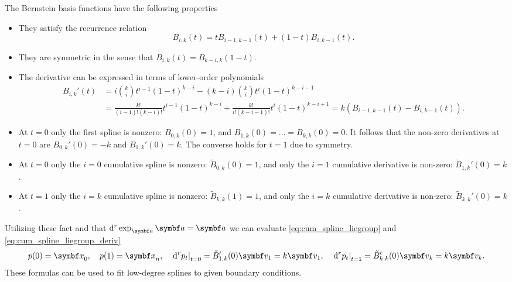 The Bernstein basis functions have the following properties
\begin{itemize}
  \item They satisfy the recurrence relation
        \begin{equation}
          \label{eq:bezier_recurrence}
          B_{i, k}(t) = t B_{i-1, k-1}(t) + (1-t) B_{i, k-1}(t).
        \end{equation}
  \item They are symmetric in the sense that $B_{i, k}(t) = B_{k-i, k}(1 - t)$.
  \item The derivative can be expressed in terms of lower-order polynomials
        \begin{equation*}
          \begin{aligned}
            B_{i, k}'(t)
             & = i \binom{k}{i} t^{i-1} (1-t)^{k-i} - (k-i) \binom{k}{i} t^{i} (1-t)^{k-i-1}                                                                         \\
             & = \frac{k!}{(i-1)! (k-i)!} t^{i-1} (1-t)^{k-i} + \frac{k!}{i! (k-i-1)!} t^{i} (1 - t)^{k - i + 1} = k \left(  B_{i-1, k-1}(t) - B_{i, k-1}(t)\right).
          \end{aligned}
        \end{equation*}
  \item At $t = 0$ only the first spline is nonzero: $B_{0, k}(0) = 1$, and $B_{1, k}(0) = \ldots = B_{k, k}(0) = 0$. It follows that the non-zero derivatives at $t = 0$ are $B_{0, k}'(0) = -k$ and $B_{1, k}'(0) = k$. The converse holds for $t = 1$ due to symmetry.
  \item At $t = 0$ only the $i=0$ cumulative spline is nonzero: $\tilde B_{0, k}(0) = 1$, and only the $i=1$ cumulative derivative is non-zero: $\tilde B_{1, k}'(0) = k$.
  \item At $t = 1$ only the $i=k$ cumulative spline is nonzero: $\tilde B_{k, k}(1) = 1$, and only the $i=k$ cumulative derivative is non-zero: $\tilde B_{k, k}'(0) = k$.
\end{itemize}

Utilizing these fact and that $\mathrm{d}^{r} \exp_{\a} \a = \a$ we can evaluate \eqref{eq:cum_spline_liegroup} and \eqref{eq:cum_spline_liegroup_deriv}
\begin{equation}
  p(0) = \x_{0}, \quad p(1) = \x_{n}, \quad \left. \mathrm{d}^{r} p_{t} \right|_{t=0} = \tilde B_{1, k}'(0) \symbf v_{1} = k \symbf v_{1}, \quad
  \left. \mathrm{d}^{r} p_{t} \right|_{t=1} = \tilde B_{k, k}'(0) \symbf v_{k} = k \symbf v_{k}.
\end{equation}
These formulas can be used to fit low-degree splines to given boundary conditions.

